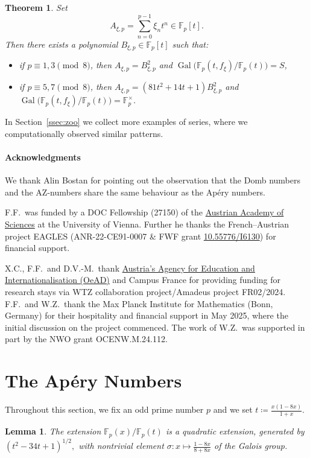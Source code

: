 \documentclass{article}
\newcommand{\F}{\mathbb{F}}
\DeclareMathOperator{\Gal}{Gal}
\theoremstyle{definition}
\theoremstyle{plain}
\newtheorem{thm}[defi]{Theorem}
\newtheorem{lem}[defi]{Lemma}
\theoremstyle{remark}
\begin{document}
\begin{thm}
\label{thm:az}
Set
\[
A_{\xi,p}=\sum_{n=0}^{p-1}\xi_nt^n\in\mathbb F_p[t].
\]
Then there exists a polynomial $B_{\xi,p} \in \F_p[t]$ such that:
\begin{itemize}
\item if $p \equiv 1,3 \pmod{8}$, then $A_{\xi,p} = B_{\xi,p}^2$ and $\Gal\big(\F_p(t, f_\xi)/\F_p(t)\big) = S$,
\item if $p \equiv 5,7 \pmod{8}$, then $A_{\xi,p} = (81t^2+14t+1) B_{\xi,p}^2$ and $\Gal\big(\F_p(t, f_\xi)/\F_p(t)\big) = \F_p^\times$.
\end{itemize}
\end{thm}

In Section~\ref{ssec:zoo} we collect more examples of series, where we computationally observed similar patterns.

\paragraph{Acknowledgments}
We thank Alin Bostan for pointing out the observation that the Domb numbers and the AZ-numbers share the same behaviour as the Apéry numbers.

F.F.\ was funded by a DOC Fellowship (27150) of the \href{https://www.oeaw.ac.at/en/}{Austrian Academy of Sciences} at the University of Vienna. Further he thanks the French–Austrian project EAGLES (ANR-22-CE91-0007 \& FWF grant \href{https://doi.org/10.55776/I6130}{10.55776/I6130}) for financial support.

X.C., F.F.\ and D.V.-M.\ thank \href{https://oead.at/en/}{Austria’s Agency for Education and Internationalisation (OeAD)} and Campus France for providing funding for research stays via WTZ collaboration project/Amadeus project FR02/2024.
F.F.\ and W.Z.\ thank the Max Planck Institute for Mathematics (Bonn, Germany) for their hospitality and financial support in May 2025, where the initial discussion on the project commenced.
The work of W.Z.\ was supported in part by the NWO grant OCENW.M.24.112.

\section{The Apéry Numbers}

Throughout this section, we fix an odd prime number $p$ and we
set $t\coloneqq \frac {x(1-8x)}{1+x}$.

\begin{lem} \label{lem:extensionxt}
The extension $\F_p(x)/\F_p(t)$ is a quadratic 
extension, generated by $(t^2-34t+1)^{1/2},$ with nontrivial element $\sigma:x\mapsto \frac{1-8x}{8+8x}$ of the Galois group.
\end{lem}
\end{document}
